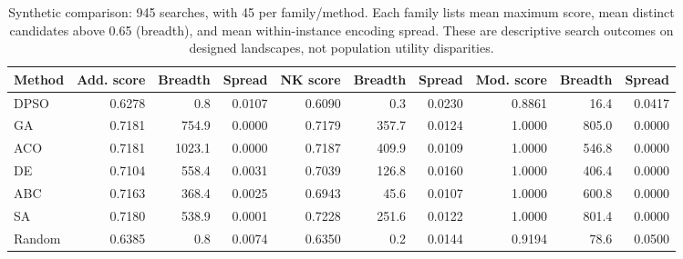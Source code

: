 \begin{table}[t]
\centering
\caption{Synthetic comparison: 945 searches, with 45 per family/method. Each family lists mean maximum score, mean distinct candidates above 0.65 (breadth), and mean within-instance encoding spread. These are descriptive search outcomes on designed landscapes, not population utility disparities.}
\label{tab:synthetic-robustness}
\small
\begin{tabular}{lrrrrrrrrr}
\toprule
Method & Add. score & Breadth & Spread & NK score & Breadth & Spread & Mod. score & Breadth & Spread \\
\midrule
DPSO & 0.6278 & 0.8 & 0.0107 & 0.6090 & 0.3 & 0.0230 & 0.8861 & 16.4 & 0.0417 \\
GA & 0.7181 & 754.9 & 0.0000 & 0.7179 & 357.7 & 0.0124 & 1.0000 & 805.0 & 0.0000 \\
ACO & 0.7181 & 1023.1 & 0.0000 & 0.7187 & 409.9 & 0.0109 & 1.0000 & 546.8 & 0.0000 \\
DE & 0.7104 & 558.4 & 0.0031 & 0.7039 & 126.8 & 0.0160 & 1.0000 & 406.4 & 0.0000 \\
ABC & 0.7163 & 368.4 & 0.0025 & 0.6943 & 45.6 & 0.0107 & 1.0000 & 600.8 & 0.0000 \\
SA & 0.7180 & 538.9 & 0.0001 & 0.7228 & 251.6 & 0.0122 & 1.0000 & 801.4 & 0.0000 \\
Random & 0.6385 & 0.8 & 0.0074 & 0.6350 & 0.2 & 0.0144 & 0.9194 & 78.6 & 0.0500 \\
\bottomrule
\end{tabular}
\end{table}
